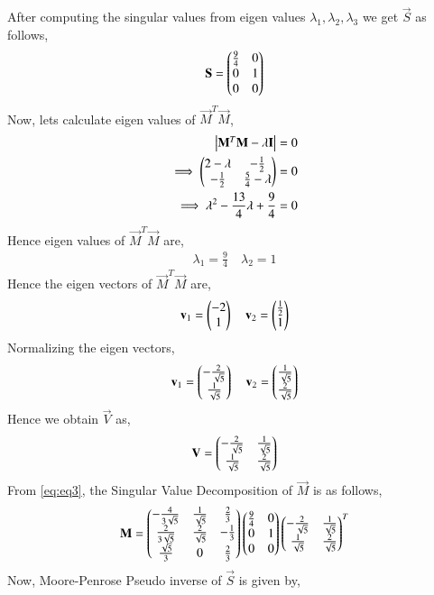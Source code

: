 \documentclass[journal,12pt,twocolumn]{IEEEtran}
\begin{document}
After computing the singular values from eigen values $\lambda_1, \lambda_2, \lambda_3$ we get $\vec{S}$ as follows,
\begin{align}
\mathbf{S}=\begin{pmatrix}\frac{9}{4}&0\\0&1\\0&0\end{pmatrix}
\end{align}
Now, lets calculate eigen values of $\vec{M}^T\vec{M}$,
\begin{align}
\begin{vmatrix}\mathbf{M}^T\mathbf{M} - \lambda\mathbf{I}\end{vmatrix} &= 0\\
\implies\begin{pmatrix}2-\lambda&-\frac{1}{2}\\-\frac{1}{2}&\frac{5}{4}-\lambda\end{pmatrix} &=0\\
\implies\lambda^2-\frac{13}{4}\lambda+\frac{9}{4} &=0
\end{align}
Hence eigen values of $\vec{M}^T\vec{M}$ are,
\begin{align}
\lambda_1 = \frac{9}{4}\quad
\lambda_2 = 1
\end{align}
Hence the eigen vectors of $\vec{M}^T\vec{M}$ are,
\begin{align}
\mathbf{v}_1=\begin{pmatrix}-2\\1\end{pmatrix} \quad
\mathbf{v}_2=\begin{pmatrix}\frac{1}{2}\\1\end{pmatrix}
\end{align}
Normalizing the eigen vectors,
\begin{align}
\mathbf{v}_1=\begin{pmatrix}-\frac{2}{\sqrt{5}}\\\frac{1}{\sqrt{5}}\end{pmatrix} \quad
\mathbf{v}_2=\begin{pmatrix}\frac{1}{\sqrt{5}}\\\frac{2}{\sqrt{5}}\end{pmatrix}
\end{align}
Hence we obtain $\vec{V}$ as,
\begin{align}
\mathbf{V}=\begin{pmatrix}-\frac{2}{\sqrt{5}}&\frac{1}{\sqrt{5}}\\\frac{1}{\sqrt{5}}&\frac{2}{\sqrt{5}}\end{pmatrix}
\end{align}
From \eqref{eq:eq3}, the Singular Value Decomposition of $\vec{M}$ is as follows,
\begin{align}
\mathbf{M} = \begin{pmatrix}-\frac{4}{3\sqrt{5}}&\frac{1}{\sqrt{5}}&\frac{2}{3}\\\frac{2}{3\sqrt{5}}&\frac{2}{\sqrt{5}}&-\frac{1}{3}\\\frac{\sqrt{5}}{3}&0&\frac{2}{3}\end{pmatrix}\begin{pmatrix}\frac{9}{4}&0\\0&1\\0&0\end{pmatrix}\begin{pmatrix}-\frac{2}{\sqrt{5}}&\frac{1}{\sqrt{5}}\\\frac{1}{\sqrt{5}}&\frac{2}{\sqrt{5}}\end{pmatrix}^T
\end{align}
Now, Moore-Penrose Pseudo inverse of $\vec{S}$ is given by,
\end{document}
